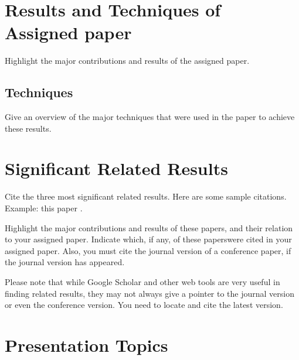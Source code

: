 \documentclass[paper=a4, fontsize=11pt]{scrartcl} %
\numberwithin{equation}{section} %
\numberwithin{figure}{section} %
\numberwithin{table}{section} %
\begin{document}

\section{Results and Techniques of Assigned paper}

Highlight the major contributions and results of the assigned paper.

\subsection{Techniques}
Give an overview of the major techniques that were used in the paper to achieve these results. 



\section{Significant Related Results}

Cite the three most significant related results. Here are some sample citations.
Example: this paper \cite{S97}.

Highlight the major contributions and results of these papers, and their relation to your assigned
paper. Indicate which, if any, of these paperswere cited in your assigned paper.
Also, you must cite the journal version of a conference paper, if the journal version has appeared.

Please note that while Google Scholar and other web tools are very useful in finding related results, they may not always give a pointer to the journal version or even the conference version. You need to locate and cite the latest version. 




\section{Presentation Topics}
\end{document}
